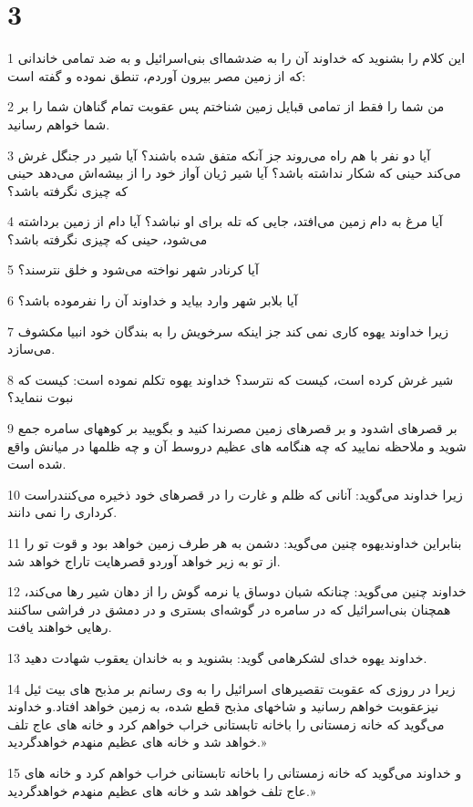 \chapter{3}

\par 1 این کلام را بشنوید که خداوند آن را به ضدشما‌ای بنی‌اسرائیل و به ضد تمامی خاندانی که از زمین مصر بیرون آوردم، تنطق نموده و گفته است:
\par 2 من شما را فقط از تمامی قبایل زمین شناختم پس عقوبت تمام گناهان شما را بر شما خواهم رسانید.
\par 3 آیا دو نفر با هم راه می‌روند جز آنکه متفق شده باشند؟ آیا شیر در جنگل غرش می‌کند حینی که شکار نداشته باشد؟ آیا شیر ژیان آواز خود را از بیشه‌اش می‌دهد حینی که چیزی نگرفته باشد؟
\par 4 آیا مرغ به دام زمین می‌افتد، جایی که تله برای او نباشد؟ آیا دام از زمین برداشته می‌شود، حینی که چیزی نگرفته باشد؟
\par 5 آیا کرنادر شهر نواخته می‌شود و خلق نترسند؟
\par 6 آیا بلابر شهر وارد بیاید و خداوند آن را نفرموده باشد؟
\par 7 زیرا خداوند یهوه کاری نمی کند جز اینکه سرخویش را به بندگان خود انبیا مکشوف می‌سازد.
\par 8 شیر غرش کرده است، کیست که نترسد؟ خداوند یهوه تکلم نموده است: کیست که نبوت ننماید؟
\par 9 بر قصرهای اشدود و بر قصرهای زمین مصرندا کنید و بگویید بر کوههای سامره جمع شوید و ملاحظه نمایید که چه هنگامه های عظیم دروسط آن و چه ظلمها در میانش واقع شده است.
\par 10 زیرا خداوند می‌گوید: آنانی که ظلم و غارت را در قصرهای خود ذخیره می‌کنندراست کرداری را نمی دانند.
\par 11 بنابراین خداوندیهوه چنین می‌گوید: دشمن به هر طرف زمین خواهد بود و قوت تو را از تو به زیر خواهد آوردو قصرهایت تاراج خواهد شد.
\par 12 خداوند چنین می‌گوید: چنانکه شبان دوساق یا نرمه گوش را از دهان شیر رها می‌کند، همچنان بنی‌اسرائیل که در سامره در گوشه‌ای بستری و در دمشق در فراشی ساکنند رهایی خواهند یافت.
\par 13 خداوند یهوه خدای لشکرهامی گوید: بشنوید و به خاندان یعقوب شهادت دهید.
\par 14 زیرا در روزی که عقوبت تقصیرهای اسرائیل را به وی رسانم بر مذبح های بیت ئیل نیزعقوبت خواهم رسانید و شاخهای مذبح قطع شده، به زمین خواهد افتاد.و خداوند می‌گوید که خانه زمستانی را باخانه تابستانی خراب خواهم کرد و خانه های عاج تلف خواهد شد و خانه های عظیم منهدم خواهدگردید.»
\par 15 و خداوند می‌گوید که خانه زمستانی را باخانه تابستانی خراب خواهم کرد و خانه های عاج تلف خواهد شد و خانه های عظیم منهدم خواهدگردید.»

